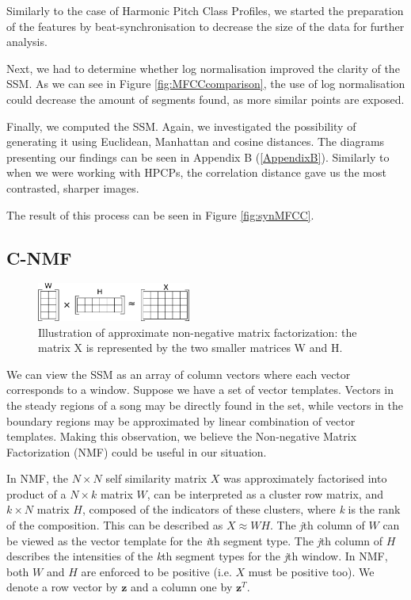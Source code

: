 Similarly to the case of Harmonic Pitch Class Profiles, we started the preparation of the features by beat-synchronisation to decrease the size of the data for further analysis. 

Next, we had to determine whether log normalisation improved the clarity of the SSM. As we can see in Figure \ref{fig:MFCCcomparison}, the use of log normalisation could decrease the amount of segments found, as more similar points are exposed.

Finally, we computed the SSM. Again, we investigated the possibility of generating it using Euclidean, Manhattan and cosine distances. The diagrams presenting our findings can be seen in Appendix B (\ref{AppendixB}). Similarly to when we were working with HPCPs, the correlation distance gave us the most contrasted, sharper images. 

The result of this process can be seen in Figure \ref{fig:synMFCC}.

\vspace{10pt}

\subsection{C-NMF}


\begin{figure}
\vspace{-20pt}
  \begin{center}
    \includegraphics[width=0.45\textwidth]{Figures/NMF}
  \end{center}
  \caption{Illustration of approximate non-negative matrix factorization: the matrix X is represented by the two smaller matrices W and H.}
\label{fig:NMF}
\end{figure}

We can view the SSM as an array of column vectors where each vector corresponds to a window. Suppose we have a set of vector templates. Vectors in the steady regions of a song may be directly found in the set, while vectors in the boundary regions may be approximated by linear combination of vector templates. Making this observation, we believe the Non-negative Matrix Factorization (NMF) could be useful in our situation.

In NMF, the $N \times N$ self similarity matrix $X$ was approximately factorised into product of a $N \times k$ matrix $W$, can be interpreted as a cluster row matrix, and $k \times N$ matrix $H$, composed of the indicators of these clusters, where \textit{k} is the rank of the composition. This can be described as $X \approx WH$. The \textit{j}th column of $W$ can be viewed as the vector template for the \textit{i}th segment type. The \textit{j}th column of $H$ describes the intensities of the \textit{k}th segment types for the \textit{j}th window. In NMF, both $W$ and $H$ are enforced to be positive (i.e. $X$ must be positive too). We denote a row vector by $\boldsymbol{z}$ and a column one by $\boldsymbol{z}^{T}$.

